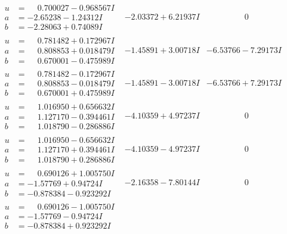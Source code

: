 \documentclass[1p]{elsarticle_modified}
\theoremstyle{definition}
\begin{document}
$$\begin{array}{c|c|c}
\begin{aligned}
u &= \phantom{-}0.700027 - 0.968567 I \\
a &= -2.65238 - 1.24312 I \\
b &= -2.28063 + 0.74089 I\end{aligned}
 & -2.03372 + 6.21937 I & \phantom{-0.000000 } 0 \\ \hline\begin{aligned}
u &= \phantom{-}0.781482 + 0.172967 I \\
a &= \phantom{-}0.808853 + 0.018479 I \\
b &= \phantom{-}0.670001 - 0.475989 I\end{aligned}
 & -1.45891 + 3.00718 I & -6.53766 - 7.29173 I \\ \hline\begin{aligned}
u &= \phantom{-}0.781482 - 0.172967 I \\
a &= \phantom{-}0.808853 - 0.018479 I \\
b &= \phantom{-}0.670001 + 0.475989 I\end{aligned}
 & -1.45891 - 3.00718 I & -6.53766 + 7.29173 I \\ \hline\begin{aligned}
u &= \phantom{-}1.016950 + 0.656632 I \\
a &= \phantom{-}1.127170 - 0.394461 I \\
b &= \phantom{-}1.018790 - 0.286886 I\end{aligned}
 & -4.10359 + 4.97237 I & \phantom{-0.000000 } 0 \\ \hline\begin{aligned}
u &= \phantom{-}1.016950 - 0.656632 I \\
a &= \phantom{-}1.127170 + 0.394461 I \\
b &= \phantom{-}1.018790 + 0.286886 I\end{aligned}
 & -4.10359 - 4.97237 I & \phantom{-0.000000 } 0 \\ \hline\begin{aligned}
u &= \phantom{-}0.690126 + 1.005750 I \\
a &= -1.57769 + 0.94724 I \\
b &= -0.878384 - 0.923292 I\end{aligned}
 & -2.16358 - 7.80144 I & \phantom{-0.000000 } 0 \\ \hline\begin{aligned}
u &= \phantom{-}0.690126 - 1.005750 I \\
a &= -1.57769 - 0.94724 I \\
b &= -0.878384 + 0.923292 I\end{aligned}

\end{array}$$
\end{document}
